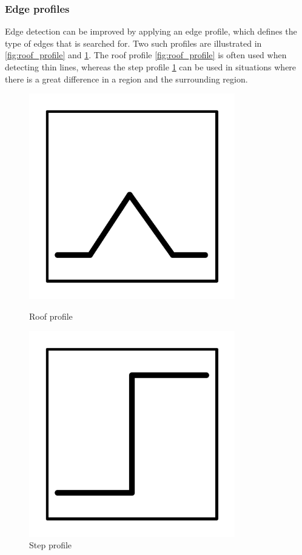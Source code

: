 \subsubsection{Edge profiles}
Edge detection can be improved by applying an edge profile, which defines the type of edges that is searched for. Two such profiles are illustrated in \cref{fig:roof_profile} and \ref{fig:step_profile}. The roof profile \cref{fig:roof_profile} is often used when detecting thin lines, whereas the step profile \cref{fig:step_profile} can be used in situations where there is a great difference in a region and the surrounding region.
\begin{figure}[H]
    \begin{minipage}{0.5\textwidth}
    	\centering
    	\includegraphics[width=0.80\textwidth]{graphics/roof_profile.pdf}
    	\caption{Roof profile}
    	\label{fig:roof_profile}
    \end{minipage}%
	\begin{minipage}{0.5\textwidth}
    	\centering
    	\includegraphics[width=0.80\textwidth]{graphics/step_profile.pdf}
    	\caption{Step profile}
    	\label{fig:step_profile}
	\end{minipage}
\end{figure}



